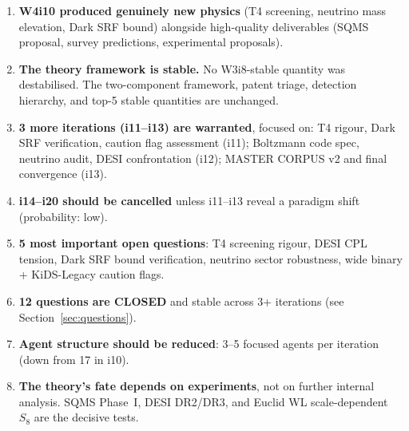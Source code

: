 \documentclass[11pt]{article}
\begin{document}
\begin{enumerate}
\item \textbf{W4i10 produced genuinely new physics} (T4 screening,
  neutrino mass elevation, Dark SRF bound) alongside high-quality
  deliverables (SQMS proposal, survey predictions, experimental proposals).

\item \textbf{The theory framework is stable.} No W3i8-stable quantity
  was destabilised. The two-component framework, patent triage, detection
  hierarchy, and top-5 stable quantities are unchanged.

\item \textbf{3 more iterations (i11--i13) are warranted}, focused on:
  T4 rigour, Dark SRF verification, caution flag assessment (i11);
  Boltzmann code spec, neutrino audit, DESI confrontation (i12);
  MASTER CORPUS v2 and final convergence (i13).

\item \textbf{i14--i20 should be cancelled} unless i11--i13 reveal a
  paradigm shift (probability: low).

\item \textbf{5 most important open questions}: T4 screening rigour,
  DESI CPL tension, Dark SRF bound verification, neutrino sector
  robustness, wide binary + KiDS-Legacy caution flags.

\item \textbf{12 questions are CLOSED} and stable across 3+ iterations
  (see Section~\ref{sec:questions}).

\item \textbf{Agent structure should be reduced}: 3--5 focused agents per
  iteration (down from 17 in i10).

\item \textbf{The theory's fate depends on experiments}, not on further
  internal analysis. SQMS Phase~I, DESI DR2/DR3, and Euclid WL
  scale-dependent $S_8$ are the decisive tests.
\end{enumerate}
\end{document}
